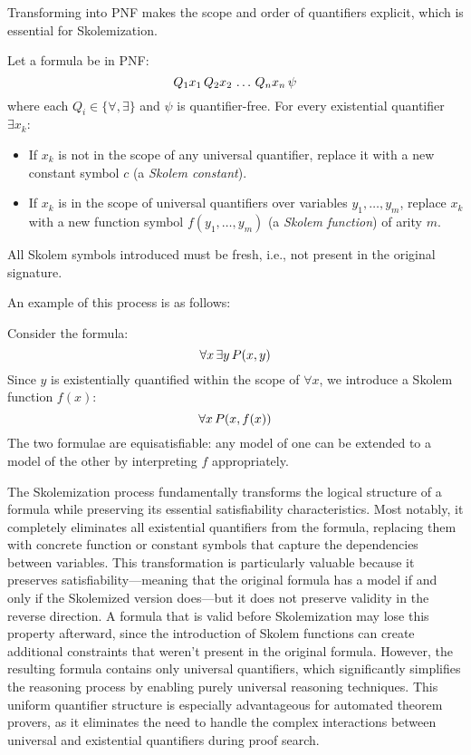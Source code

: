 Transforming into PNF makes the scope and order of quantifiers explicit, which is essential for Skolemization.

\begin{definition}
Let a formula be in PNF\@:
\[
Q_1 x_1 \, Q_2 x_2 \, \dots \, Q_n x_n \, \psi
\]
where each \(Q_i \in \{\forall, \exists\}\) and \(\psi\) is quantifier-free.  
For every existential quantifier \(\exists x_k\):
\begin{itemize}
  \item If \(x_k\) is not in the scope of any universal quantifier, replace it with a new constant symbol \(c\) (a \emph{Skolem constant}).
  \item If \(x_k\) is in the scope of universal quantifiers over variables \(y_1, \dots, y_m\), replace \(x_k\) with a new function symbol \(f(y_1, \dots, y_m)\) (a \emph{Skolem function}) of arity \(m\).
\end{itemize}
All Skolem symbols introduced must be fresh, i.e., not present in the original signature.
\end{definition}

An example of this process is as follows:

Consider the formula:
\[
\forall x \, \exists y \, P(x, y)
\]
Since \(y\) is existentially quantified within the scope of \(\forall x\), we introduce a Skolem function \(f(x)\):
\[
\forall x \, P(x, f(x))
\]
The two formulae are equisatisfiable: any model of one can be extended to a model of the other by interpreting \(f\) appropriately.

The Skolemization process fundamentally transforms the logical structure of a formula while preserving its essential satisfiability characteristics.
Most notably, it completely eliminates all existential quantifiers from the formula, replacing them with concrete function or constant symbols that capture the dependencies between variables.
This transformation is particularly valuable because it preserves satisfiability—meaning that the original formula has a model if and only if the Skolemized version does—but it does not preserve validity in the reverse direction.
A formula that is valid before Skolemization may lose this property afterward, since the introduction of Skolem functions can create additional constraints that weren't present in the original formula.
However, the resulting formula contains only universal quantifiers, which significantly simplifies the reasoning process by enabling purely universal reasoning techniques. 
This uniform quantifier structure is especially advantageous for automated theorem provers, as it eliminates the need to handle the complex interactions between universal and existential quantifiers during proof search.

